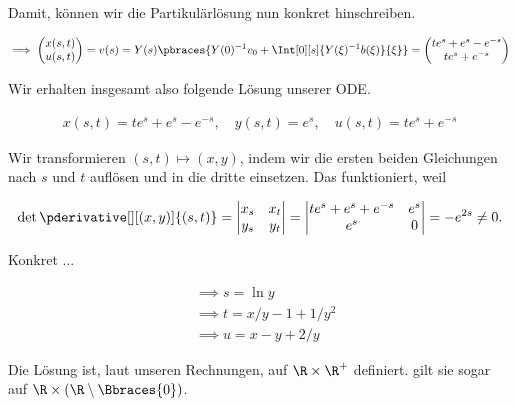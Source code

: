 \begin{solution}
Damit, können wir die Partikulärlösung nun konkret hinschreiben.

\begin{align*}
    \implies
    \begin{pmatrix}
        x(s, t)  \\ u(s, t)
    \end{pmatrix}
    =
    v(s)
    =
    Y(s)
    \pbraces
    {
        Y(0)^{-1} v_0
        +
        \Int[0][s]{Y(\xi)^{-1} b(\xi)}{\xi}
    }
    =
    \begin{pmatrix}
        t e^s + e^s - e^{-s} \\
        t e^s + e^{-s}
    \end{pmatrix}
\end{align*}

Wir erhalten insgesamt also folgende Lösung unserer ODE.

\begin{align*}
    x(s, t) = t e^s + e^s - e^{-s},
    \quad
    y(s, t) = e^s,
    \quad
    u(s, t) = t e^s + e^{-s}
\end{align*}

Wir transformieren $(s, t) \mapsto (x, y)$, indem wir die ersten beiden Gleichungen nach $s$ und $t$ auflösen und in die dritte einsetzen.
Das funktioniert, weil

\begin{align*}
    \det \pderivative[][(x, y)]{(s, t)}
    =
    \begin{vmatrix}
        x_s & x_t \\
        y_s & y_t
    \end{vmatrix}
    =
    \begin{vmatrix}
        t e^s + e^s + e^{-s} & e^s \\
        e^s                  & 0
    \end{vmatrix}
    =
    -e^{2s} \neq 0.
\end{align*}

Konkret ...

\begin{align*}
    & \implies
    s = \ln{y} \\
    & \implies
    t = x/y - 1 + 1/y^2 \\
    & \implies
    u = x - y + 2/y
\end{align*}

Die Lösung ist, laut unseren Rechnungen, auf $\R \times \R^+$ definiert.
 gilt sie sogar auf $\R \times (\R \setminus \Bbraces{0})$.

\end{solution}

